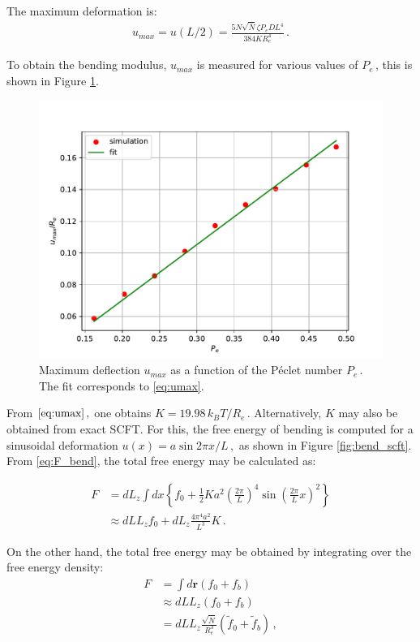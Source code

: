 \documentclass[bachelor,       %
               twoside,        %
               BCOR10mm,       %
               ngerman, english %
               ]{GAUBM}
\begin{document}
The maximum deformation is:
\begin{align}
    u_{max}=u(L/2)=\frac{5N\sqrt{\bar N}\zeta P_e DL^4}{384KR_e^4}\,.
    \label{eq:umax}
\end{align}

To obtain the bending modulus, $u_{max}$ is measured for various values of $P_e\,$, this is shown in Figure \ref{fig:stress_strain}.

\begin{figure}[h]
    \centering
    \includegraphics[width=0.6\linewidth]{figures/stress_strain_plot.pdf}
    \caption{Maximum deflection  $u_{max}$ as a function of the P\'eclet number $P_e\,.$ The fit corresponds to \eqref{eq:umax}.}
    \label{fig:stress_strain}
\end{figure}


From $\eqref{eq:umax}\,,$ one obtains $K=19.98\,k_BT/R_e\,.$ Alternatively, $K$ may also be obtained from exact \ac{SCFT}. For this, the free energy of bending is computed for a sinusoidal deformation $u(x)=a\sin2\pi x/L\,,$ as shown in Figure \ref{fig:bend_scft}. From \eqref{eq:F_bend}, the total free energy may be calculated as:

\begin{align}
    F&=dL_z\int dx\left\{f_0+\frac{1}{2}Ka^2\left(\frac{2\pi}{L}\right)^4\sin\left(\frac{2\pi}{L}x\right)^2\right\}\nonumber\\
    &\approx dLL_zf_0+dL_z\frac{4\pi^4a^2}{L^3}K\,.
    \label{eq:f_scft_1}
\end{align}

On the other hand, the total free energy may be obtained by integrating over the free energy density:
\begin{align}
    F&=\int d\mathbf r(f_0+f_b)\nonumber\\
    &\approx dLL_z(f_0+f_b)\nonumber \\
    &=dLL_z\frac{\sqrt{\bar N}}{R_e^3}(\tilde f_0+\tilde f_b)\,,
    \label{eq:f_scft_2}
\end{align}
\end{document}
